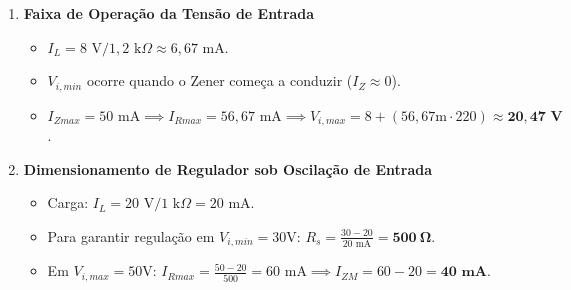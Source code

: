 \documentclass[a4paper,12pt]{article}
\begin{document}
\begin{enumerate}[label=\textbf{Questão \arabic*:}, leftmargin=*]
    \item \textbf{Faixa de Operação da Tensão de Entrada}
    \begin{itemize}
        \item $I_L = 8\text{ V}/1,2\text{ k}\Omega \approx 6,67\text{ mA}$.
        \item $V_{i,min}$ ocorre quando o Zener começa a conduzir ($I_Z \approx 0$).
        \item $I_{Zmax} = 50\text{ mA} \implies I_{Rmax} = 56,67\text{ mA} \implies V_{i,max} = 8 + (56,67\text{m} \cdot 220) \approx \mathbf{20,47\text{ V}}$.
    \end{itemize}

    \item \textbf{Dimensionamento de Regulador sob Oscilação de Entrada}
    \begin{itemize}
        \item Carga: $I_L = 20\text{ V}/1\text{ k}\Omega = 20\text{ mA}$.
        \item Para garantir regulação em $V_{i,min}=30\text{V}$: $R_s = \frac{30-20}{20\text{ mA}} = \mathbf{500~\Omega}$.
        \item Em $V_{i,max}=50\text{V}$: $I_{Rmax} = \frac{50-20}{500} = 60\text{ mA} \implies I_{ZM} = 60 - 20 = \mathbf{40\text{ mA}}$.
    \end{itemize}

\end{enumerate}
\end{document}

